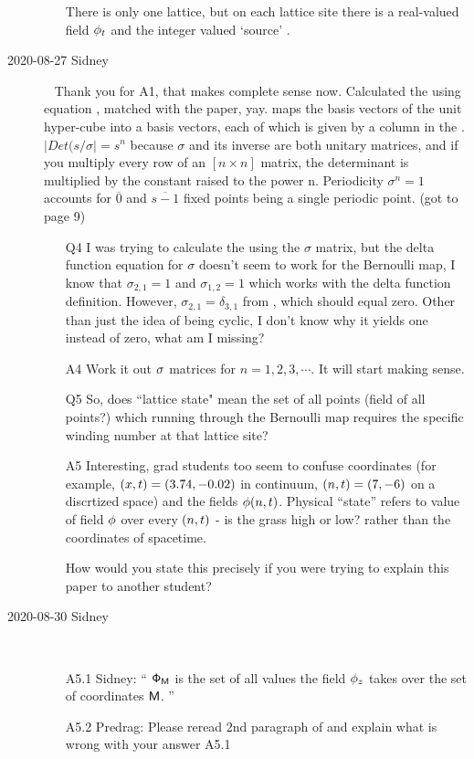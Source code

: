 \begin{description}
\begin{itemize}
There is only one lattice, but on each lattice site there is a
real-valued field $\phi_{t}$ and the integer valued `source' \Ssym{\zeit}.
\end{itemize}

\item[2020-08-27 Sidney]~
Thank you for A1, that makes complete sense now. Calculated the {\jacobianOrb} using equation , matched with the paper, yay.
{\JacobianOrb} maps the basis vectors of the unit hyper-cube into a
{\fundPip} basis vectors, each of which is given by a
column in the {\jacobianOrb}. $|Det(s/\sigma|=s^n$ because $\sigma$ and
its inverse are both unitary matrices, and if you multiply every row of
an $[n\times{n}]$ matrix, the determinant is multiplied by the constant
raised to the power n. Periodicity $\sigma^n=1$ accounts for
$\overline{0}$ and $\overline{s-1}$ fixed points being a single periodic
point. (got to page 9)

\begin{itemize}
	\item[Q4]
I was trying to calculate the {\jacobianOrb} using the $\sigma$ matrix, but the delta function equation  for $\sigma$ doesn't seem to work for the Bernoulli map, I know that $\sigma_{2,1}=1$ and $\sigma_{1,2}=1$ which works with the delta function definition. However, $\sigma_{2,1}=\delta_{3,1}$ from , which should equal zero. Other than just the idea of being cyclic, I don't know why it yields one instead of zero, what am I missing?
  \item[A4]
Work it out $\mathbf{\sigma}$ matrices for $n=1,2,3,\cdots$. It will start making sense.
	\item[Q5]
So, does ``lattice state" mean the set of all points (field of all points?) which running through the Bernoulli map requires the specific winding number at that lattice site?
  \item[A5]
Interesting, grad students too seem to confuse coordinates (for example,
$(x,t)=(3.74,-0.02)$ in continuum, $(n,t)=(7,-6)$ on a discrtized space)
and the
fields $\phi(n,t)$. Physical ``state'' refers to value of field $\phi$
over every $(n,t)$ - is the grass high or low? rather than the coordinates
of spacetime.

How would you state this precisely if you were trying to explain this
paper to another student?
\end{itemize}

\item[2020-08-30 Sidney]~~
\begin{itemize}
  \item[A5.1]
Sidney: ``
$\mathsf{\Phi}_{\mathsf{M}}$ is the set of all values the field $\phi_z$ takes over
the set of coordinates $\mathsf{M}$.
''
  \item[A5.2]
Predrag: Please reread 2nd paragraph of  and explain what
is wrong with your answer A5.1
\end{itemize}


\end{description}
